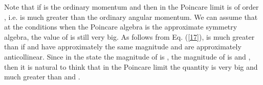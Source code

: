 \documentclass[a4paper,12pt]{article}%
\begin{document}
Note that if \coordHE{} is the ordinary momentum
and \coordHE{} then in the Poincare limit 
\coordHE{} is of order \coordHE{}, i.e. is much greater 
than the ordinary angular momentum. We can assume
that at the conditions when the Poincare algebra is
the approximate symmetry algebra, the value of
\coordHE{} is still very big.
As follows from Eq. (\ref{17}), \coordHE{} is 
much greater than \coordHE{} if \coordHE{} 
and \coordHE{} have approximately the same 
magnitude and are
approximately anticollinear. Since in the state
\coordHE{} the magnitude of \coordHE{} is 
\coordHE{}, the magnitude of \coordHE{} is \coordHE{}
and \coordHE{}, then it is natural to think
that in the Poincare limit the quantity \coordHE{} is
very big and much greater than \coordHE{} and \coordHE{}.
\end{document}
